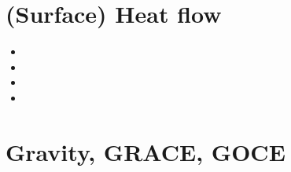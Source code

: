 \section{(Surface) Heat flow}
\begin{scriptsize}
\begin{itemize}
\item[\nineteensixtyseven] 
\item[\nineteenninetynine] 
\item[\twothousandten] 
\item[\twothousandtwenty]
\end{itemize}
\end{scriptsize}

\section{Gravity, GRACE, GOCE}

